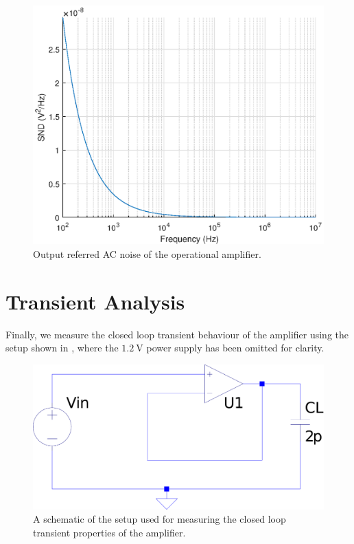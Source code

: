\documentclass[journal,hidelinks]{IEEEtran}
\begin{document}
\begin{figure}[!htb]
  \centering
  \includegraphics[width=\columnwidth]{ac_noise.eps}
  \caption{Output referred AC noise of the operational amplifier.}
  \label{fig:ac_noise}
\end{figure}

\section{Transient Analysis}

Finally, we measure the closed loop transient behaviour of the amplifier using the setup shown in , where the $\SI{1.2}{\volt}$ power supply has been omitted for clarity.

\begin{figure}[!htb]
  \centering
  \includegraphics[width=\columnwidth]{tran_setup.pdf}
  \caption{A schematic of the setup used for measuring the closed loop transient properties of the amplifier.}
  \label{fig:tran_setup}
\end{figure}
\end{document}
